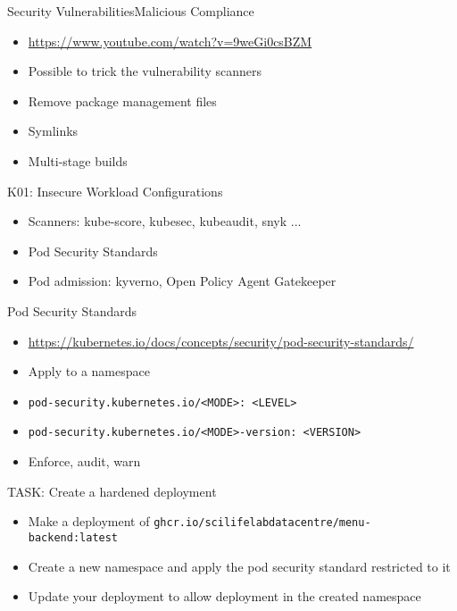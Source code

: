 \documentclass{dcpresentation}
\begin{document}
\begin{frame}{Security Vulnerabilities}{Malicious Compliance}
  \begin{itemize}
  \item \url{https://www.youtube.com/watch?v=9weGi0csBZM}
  \item Possible to trick the vulnerability scanners
  \item Remove package management files
  \item Symlinks
  \item Multi-stage builds
  \end{itemize}  
\end{frame}


\begin{frame}{K01: Insecure Workload Configurations}
  \begin{itemize}
  \item Scanners: kube-score, kubesec, kubeaudit, snyk ...
  \item Pod Security Standards
  \item Pod admission: kyverno, Open Policy Agent Gatekeeper
  \end{itemize}
\end{frame}

\begin{frame}{Pod Security Standards}
  \begin{itemize}
  \item \url{https://kubernetes.io/docs/concepts/security/pod-security-standards/}
  \item Apply to a namespace
  \item \texttt{pod-security.kubernetes.io/<MODE>: <LEVEL>}
  \item \texttt{pod-security.kubernetes.io/<MODE>-version: <VERSION>}
  \item Enforce, audit, warn
  \end{itemize}

\end{frame}



\begin{frame}{TASK: Create a hardened deployment}
  \begin{itemize}
  \item Make a deployment of \texttt{ghcr.io/scilifelabdatacentre/menu-backend:latest}
  \item Create a new namespace and apply the pod security standard restricted to it
  \item Update your deployment to allow deployment in the created namespace
  \end{itemize}
\end{frame}
\end{document}
